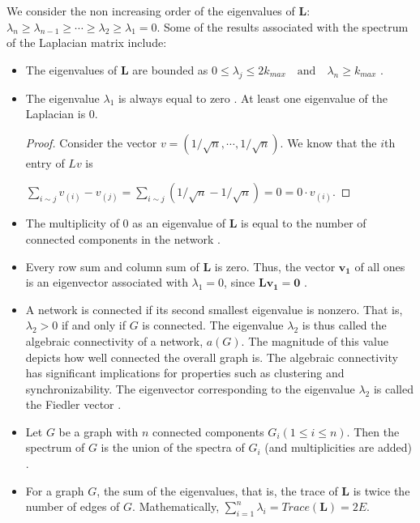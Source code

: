 \documentclass[10pt,a4paper]{article}
\theoremstyle{plain}
\theoremstyle{definition}
\begin{document}
We consider the non increasing order of the eigenvalues of $\mathbf{L}$: $\lambda_n  \geq \lambda_{n-1} \geq  \cdots \geq \lambda_2 \geq \lambda_1 =0 $. Some of the results associated with the spectrum of the Laplacian matrix include:
\begin{itemize}
	\item The eigenvalues of $\mathbf{L}$ are bounded as 
	$ 0 \leq \lambda_j \leq 2k_{max} \quad \text{and} \quad \lambda_n \geq k_{max} $ \citep{estrada2011structure}.
	\item The eigenvalue $\lambda_1$ is always equal to zero \citep{estrada2011structure}. At least one eigenvalue of the Laplacian is $0$.
	\begin{proof}
		Consider the vector $v= (1/\sqrt{n}, \cdots, 1/\sqrt{n}) $. We know that the $i$th entry of $Lv$ is 
		
		$\sum_{i\sim j} v_{(i)}- v_{(j)} = \sum_{i\sim j} (1/\sqrt{n} - 1/\sqrt{n}) = 0 = 0 \cdot v_{(i)}$.
	\end{proof}
	\item The multiplicity of $0$ as an eigenvalue of $\mathbf{L}$ is equal to the number of connected components in the network \citep{estrada2011structure}.
	\item Every row sum and column sum of $\mathbf{L}$ is zero. Thus, the vector $\mathbf{v_1}$ of all ones is an eigenvector associated with $\lambda_1 =0$, since $\mathbf{Lv_1} = \mathbf{0} $ \citep{das2004laplacian}.
	\item  A network is connected if its second smallest eigenvalue is nonzero. That is, $\lambda_2> 0$ if and only if $G$ is connected. The eigenvalue $\lambda_2$ is thus called the algebraic connectivity of a network, $a(G)$. The magnitude of this value depicts how well connected the overall graph is. The algebraic connectivity has significant implications for properties such as clustering and synchronizability.
	The eigenvector corresponding to the eigenvalue $\lambda_2$ is called the Fiedler vector \citep{estrada2015first}.
	
	\item Let $G$ be a graph with $n$ connected components $G_i (1 \leq i \leq n)$. Then the spectrum of $G$ is the union of the spectra of $G_i$ (and multiplicities are added) \citep{brouwer2011spectra}.
	
	\item For a graph $G$, the sum of the eigenvalues, that is, the trace of $\mathbf{L}$ is twice the number of edges of $G$. Mathematically, $\sum_{i=1}^n \lambda_i = Trace(\mathbf{L}) = 2E.$ \citep{brouwer2011spectra}\\
\end{itemize}
\end{document}
